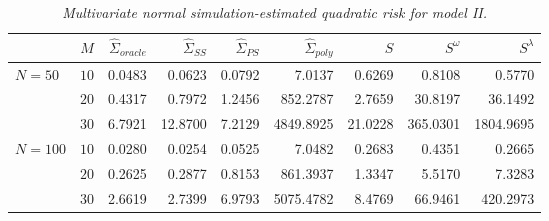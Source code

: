 \begin{table}[H]
\centering
\caption{\textit{Multivariate normal simulation-estimated quadratic risk  for model II.} }
\begin{tabular}{lrrrrrrrr}
& $M$ &$\hat{\Sigma}_{oracle}$&$\hat{\Sigma}_{SS}$& $\hat{\Sigma}_{PS}$ & $\hat{\Sigma}_{poly}$ & $S$ &$S^\omega$& $S^\lambda$ \\ 
  \hline
$N = 50$ & $10$ & 0.0483 & 0.0623 & 0.0792 & 7.0137 & 0.6269 & 0.8108 & 0.5770 \\ 
    & $20$ & 0.4317 & 0.7972 & 1.2456 &  852.2787 & 2.7659 & 30.8197 & 36.1492 \\ 
     & $30$ & 6.7921 & 12.8700 & 7.2129 & 4849.8925 & 21.0228 & 365.0301 & 1804.9695 \\ 
     $N = 100$ & $10$ &0.0280 & 0.0254 & 0.0525 &  7.0482 & 0.2683 & 0.4351 & 0.2665 \\ 
    & $20$ &0.2625 & 0.2877 & 0.8153 &  861.3937 & 1.3347 & 5.5170 & 7.3283 \\ 
     & $30$ &2.6619 & 2.7399 & 6.9793 &  5075.4782 & 8.4769 & 66.9461 & 420.2973 \\ 

   \hline
\end{tabular}
\label{table:simulation-1-quad-loss-sigma-2}
\end{table}
 

